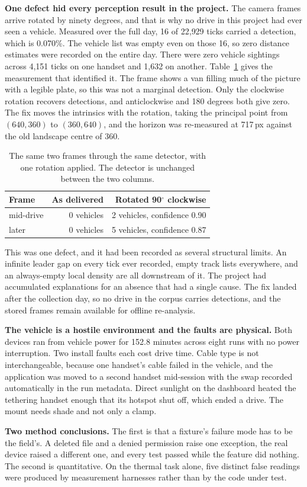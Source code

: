 \noindent\textbf{One defect hid every perception result in the project.}
The camera frames arrive rotated by ninety degrees, and that is why no drive in
this project had ever seen a vehicle. Measured over the full day, 16 of 22{,}929 ticks carried a detection, which is
0.070\%. The vehicle list was empty even on those 16, so zero distance estimates
were recorded on the entire day. There
were zero vehicle sightings across 4{,}151 ticks on one handset and 1{,}632 on
another. Table~\ref{tab:rotation} gives the measurement that identified it. The
frame shows a van filling much of the picture with a legible plate, so this was
not a marginal detection. Only the clockwise rotation recovers detections, and
anticlockwise and 180 degrees both give zero. The fix moves the intrinsics with
the rotation, taking the principal point from $(640, 360)$ to $(360, 640)$, and
the horizon was re-measured at 717\,px against the old landscape centre of 360.

\begin{table}[t]
\centering
\caption{The same two frames through the same detector, with one rotation
applied. The detector is unchanged between the two columns.}
\label{tab:rotation}
\small
\begin{tabular}{lrr}
\toprule
\textbf{Frame} & \textbf{As delivered} & \textbf{Rotated 90$^\circ$ clockwise} \\
\midrule
mid-drive & 0 vehicles & 2 vehicles, confidence 0.90 \\
later & 0 vehicles & 5 vehicles, confidence 0.87 \\
\bottomrule
\end{tabular}
\end{table}

This was one defect, and it had been recorded as several structural limits. An
infinite leader gap on every tick ever recorded, empty track lists everywhere,
and an always-empty local density are all downstream of it. The project had
accumulated explanations for an absence that had a single cause. The fix landed
after the collection day, so no drive in the corpus carries detections, and the
stored frames remain available for offline re-analysis.

\noindent\textbf{The vehicle is a hostile environment and the faults are
physical.}
Both devices ran from vehicle power for 152.8 minutes across eight runs with no
power interruption. Two install faults each cost drive time. Cable type is not
interchangeable, because one handset's cable failed in the vehicle, and the
application was moved to a second handset mid-session with the swap recorded
automatically in the run metadata. Direct sunlight on the dashboard heated the
tethering handset enough that its hotspot shut off, which ended a drive. The
mount needs shade and not only a clamp.

\noindent\textbf{Two method conclusions.}
The first is that a fixture's failure mode has to be the field's. A deleted file
and a denied permission raise one exception, the real device raised a different
one, and every test passed while the feature did nothing. The second is
quantitative. On the thermal task alone, five distinct false readings were
produced by measurement harnesses rather than by the code under test.
